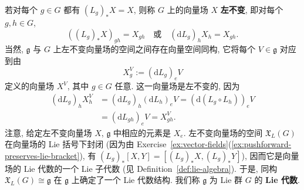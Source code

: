 若对每个 $g\in G$ 都有 $(L_g)_*X=X$, 则称 $G$ 上的向量场 $X$ \textbf{左不变}, 即对每个 $g,h\in G$,
\[
  ((L_g)_*X)_{gh}=X_{gh}\quad\text{或}\quad(\mathrm{d}L_g)_hX_h=X_{gh}.
\]
当然, $\mathfrak g$ 与 $G$ 上左不变向量场的空间之间存在向量空间同构, 它将每个 $V\in\mathfrak g$ 对应到由
\[
  X_g^V:=(\mathrm{d}L_g)_eV
\]
定义的向量场 $X^V$, 其中 $g\in G$ 任意. 这一向量场是左不变的, 因为
\begin{align*}
  (\mathrm{d}L_g)_hX_h^V
  &=(\mathrm{d}L_g)_h(\mathrm{d}L_h)_eV
    =(\mathrm{d}(L_g\circ L_h))_eV\\
  &=(\mathrm{d}L_{gh})_eV=X_{gh}^V.
\end{align*}
注意, 给定左不变向量场 $X$, $\mathfrak g$ 中相应的元素是 $X_e$. 左不变向量场的空间 $\mathfrak{X}_L(G)$ 在向量场的 Lie 括号下封闭 (因为由 Exercise~\ref{ex:vector-fields}(\ref{ex:pushforward-preserves-lie-bracket}), 有 $(L_g)_*[X,Y]=[(L_g)_*X,(L_g)_*Y]$), 因而它是向量场的 Lie 代数的一个 Lie 子代数 (见 Definition~\ref{def:lie-algebra}). 于是, 同构 $\mathfrak{X}_L(G)\cong\mathfrak g$ 在 $\mathfrak g$ 上确定了一个 Lie 代数结构. 我们称 $\mathfrak g$ 为 Lie 群 $G$ 的 \textbf{Lie 代数}.

